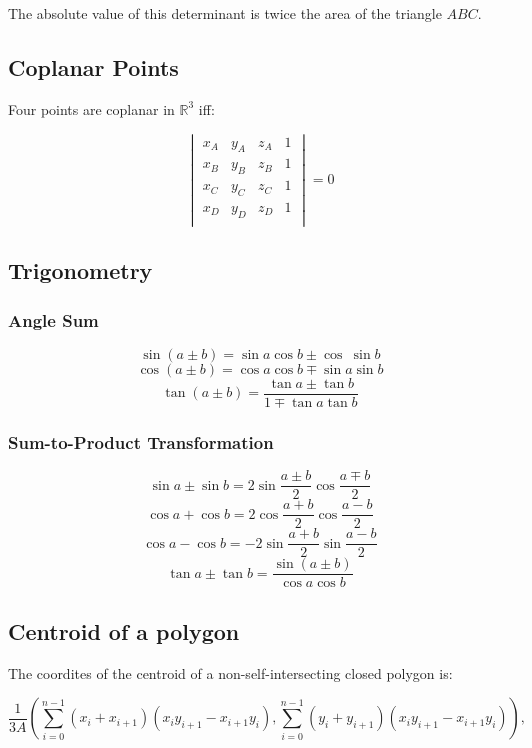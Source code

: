 The absolute value of this determinant is twice the area of the triangle $ABC$.

\subsection{Coplanar Points}

Four points are coplanar in $\mathbb{R}^3$ iff:

$$ \begin{vmatrix}
x_A & y_A & z_A & 1 \\
x_B & y_B & z_B & 1 \\
x_C & y_C & z_C & 1 \\
x_D & y_D & z_D & 1 \\
\end{vmatrix}  = 0 $$

\subsection{Trigonometry}

\subsubsection{Angle Sum}

$$ \sin(a \pm b) = \sin a \cos b \pm \cos \ \sin b $$
$$ \cos(a \pm b) = \cos a \cos b \mp \sin a \sin b $$
$$ \tan (a \pm b) = \frac{\tan a \pm \tan b}{1 \mp \tan a \tan b}$$

\subsubsection{Sum-to-Product Transformation}

$$ \sin a \pm \sin b = 2 \sin\frac{a \pm b}{2} \cos\frac{a \mp b}{2} $$
$$ \cos a + \cos b = 2 \cos\frac{a+b}{2} \cos\frac{a-b}{2} $$
$$ \cos a - \cos b = -2 \sin\frac{a+b}{2} \sin\frac{a-b}{2} $$
$$ \tan a \pm \tan b = \frac{\sin(a \pm b)}{\cos a \cos b} $$

\subsection{Centroid of a polygon}

The coordites of the centroid of a non-self-intersecting closed polygon is:

$$ \frac{1}{3A} \left(\sum_{i = 0}^{n-1}(x_i+x_{i+1})(x_iy_{i+1} - x_{i+1}y_i) , \sum_{i = 0}^{n-1}(y_i+y_{i+1})(x_iy_{i+1} - x_{i+1}y_i) \right), $$

